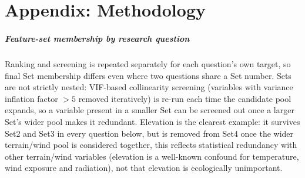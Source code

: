 \documentclass[logo,msc,ai]{infthesis}           %
\begin{document}
\chapter{Appendix: Methodology}

\paragraph*{Feature-set membership by research question}
\label{app:feature-sets}
%

Ranking and screening is repeated separately for each question's own target, so final Set
membership differs even where two questions share a Set number. Sets are not strictly nested:
VIF-based collinearity screening (variables with variance inflation factor $>5$ removed
iteratively) is re-run each time the candidate pool expands, so a variable present in a smaller
Set can be screened out once a larger Set's wider pool makes it redundant. Elevation is the
clearest example: it survives Set2 and Set3 in every question below, but is removed from Set4
once the wider terrain/wind pool is considered together, this reflects statistical redundancy
with other terrain/wind variables (elevation is a well-known confound for temperature, wind
exposure and radiation), not that elevation is ecologically unimportant.
\end{document}
